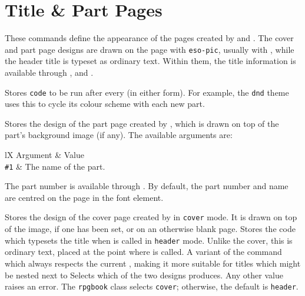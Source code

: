 	\section{Title \& Part Pages}\label{S:ThemeTitles}

		These commands define the appearance of the pages created by  and . The cover and part page designs are drawn on the page with \texttt{eso-pic}, usually with , while the header title is typeset as ordinary text. Within them, the title information is available through ,  and  .

		{
			Stores \texttt{code} to be run after every  (in either form). For example, the \texttt{dnd} theme uses this to cycle its colour scheme with each new part.
		}
		{
			Stores the design of the part page created by , which is drawn on top of the part's background image (if any). The available arguments are:
			\begin{RpgTable}{lX}
				Argument & Value
				\\
				\texttt{\#1} & The name of the part.
			\end{RpgTable}
			The part number is available through . By default, the part number and name are centred on the page in the  font element.
		}
		{
			Stores the design of the cover page created by  in \texttt{cover} mode. It is drawn on top of the  image, if one has been set, or on an otherwise blank page.
		}
		{
			Stores the code which typesets the title when  is called in \texttt{header} mode. Unlike the cover, this is ordinary text, placed at the point where  is called.
		}
		{
			A variant of the
			\href{https://tex.org.uk/macros/latex/contrib/titlesec/titlesec.pdf}{}
			command which always respects the current , making it more suitable for titles which might be nested next to 
		}
		{
			Selects which of the two designs  produces. Any other value raises an error. The \texttt{rpgbook} class selects \texttt{cover}; otherwise, the default is \texttt{header}.
		}
